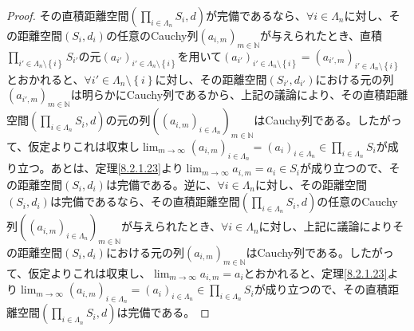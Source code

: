 \documentclass[dvipdfmx]{jsarticle}
\begin{document}
\begin{proof}
その直積距離空間$\left( \prod_{i \in \varLambda_{n}} S_{i},d \right)$が完備であるなら、$\forall i \in \varLambda_{n}$に対し、その距離空間$\left( S_{i},d_{i} \right)$の任意のCauchy列$\left( a_{i,m} \right)_{m \in \mathbb{N}}$が与えられたとき、直積$\prod_{i' \in \varLambda_{n} \setminus \left\{ i \right\}} S_{i'}$の元$\left( a_{i'} \right)_{i' \in \varLambda_{n} \setminus \left\{ i \right\}}$を用いて$\left( a_{i'} \right)_{i' \in \varLambda_{n} \setminus \left\{ i \right\}} = \left( a_{i',m} \right)_{i' \in \varLambda_{n} \setminus \left\{ i \right\}}$とおかれると、$\forall i' \in \varLambda_{n} \setminus \left\{ i \right\}$に対し、その距離空間$\left( S_{i'},d_{i'} \right)$における元の列$\left( a_{i',m} \right)_{m \in \mathbb{N}}$は明らかにCauchy列であるから、上記の議論により、その直積距離空間$\left( \prod_{i \in \varLambda_{n}} S_{i},d \right)$の元の列$\left( \left( a_{i,m} \right)_{i \in \varLambda_{n}} \right)_{m \in \mathbb{N}}$はCauchy列である。したがって、仮定よりこれは収束し$\lim_{m \rightarrow \infty}\left( a_{i,m} \right)_{i \in \varLambda_{n}} = \left( a_{i} \right)_{i \in \varLambda_{n}} \in \prod_{i \in \varLambda_{n}} S_{i}$が成り立つ。あとは、定理\ref{8.2.1.23}より$\lim_{m \rightarrow \infty}a_{i,m} = a_{i} \in S_{i}$が成り立つので、その距離空間$\left( S_{i},d_{i} \right)$は完備である。逆に、$\forall i \in \varLambda_{n}$に対し、その距離空間$\left( S_{i},d_{i} \right)$は完備であるなら、その直積距離空間$\left( \prod_{i \in \varLambda_{n}} S_{i},d \right)$の任意のCauchy列$\left( \left( a_{i,m} \right)_{i \in \varLambda_{n}} \right)_{m \in \mathbb{N}}$が与えられたとき、$\forall i \in \varLambda_{n}$に対し、上記に議論によりその距離空間$\left( S_{i},d_{i} \right)$における元の列$\left( a_{i,m} \right)_{m \in \mathbb{N}}$はCauchy列である。したがって、仮定よりこれは収束し、$\lim_{m \rightarrow \infty}a_{i,m} = a_{i}$とおかれると、定理\ref{8.2.1.23}より$\lim_{m \rightarrow \infty}\left( a_{i,m} \right)_{i \in \varLambda_{n}} = \left( a_{i} \right)_{i \in \varLambda_{n}} \in \prod_{i \in \varLambda_{n}} S_{i}$が成り立つので、その直積距離空間$\left( \prod_{i \in \varLambda_{n}} S_{i},d \right)$は完備である。
\end{proof}
\end{document}
